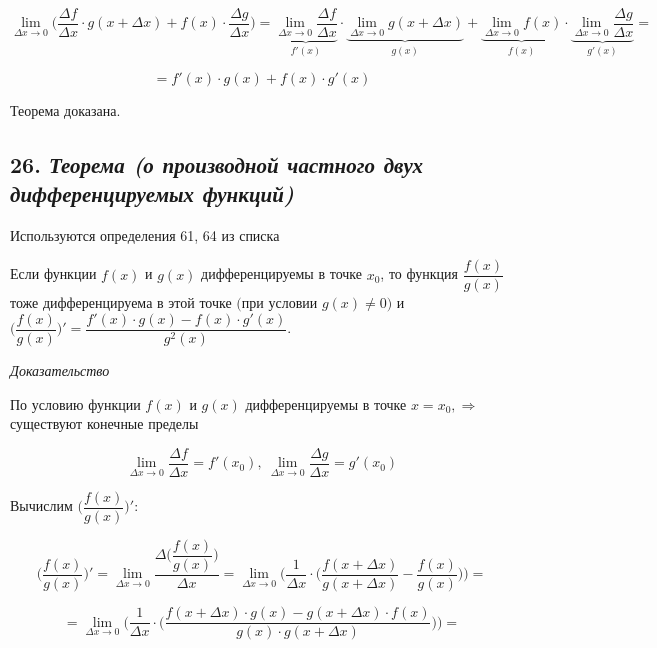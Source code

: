 $$
\lim\limits_{\Delta x \rightarrow 0}\bigg(\dfrac{\Delta f}{\Delta x}\cdot g(x + \Delta x) + f(x)\cdot \dfrac{\Delta g}{\Delta x}\bigg)
=\underbrace{\lim\limits_{\Delta x \rightarrow 0}\dfrac{\Delta f}{\Delta x}}_{f'(x)}\cdot \underbrace{\lim\limits_{\Delta x \rightarrow 0}g(x + \Delta x)}_{g(x)} + \underbrace{\lim\limits_{\Delta x \rightarrow 0}f(x)}_{f(x)}\cdot \underbrace{\lim\limits_{\Delta x \rightarrow 0}\dfrac{\Delta g}{\Delta x}}_{g'(x)}=
$$

$$ = f'(x)\cdot g(x) + f(x)\cdot g'(x) $$

Теорема доказана.
\newpage 
\subsection*{26. \textit{Теорема (о производной частного двух дифференцируемых функций)}}
\begin{Quote2} 
\small\centering 

Используются определения 61, 64 из списка \end{Quote2} 

Если функции $f(x)$ и $g(x)$ дифференцируемы в точке $x_0$, то функция ${\dfrac{f(x)}{g(x)}}$ тоже дифференцируема в этой точке $\big($при условии $g(x) \neq 0\big)$ и $\bigg({\dfrac{f(x)}{g(x)}}\bigg)' = {\dfrac{f'(x)\cdot g(x) - f(x)\cdot g'(x)}{g^2(x)}}.$
\vspace*{20pt} 

\textit{Доказательство}

По условию функции $f(x)$ и $g(x)$ дифференцируемы в точке $x = x_0, \Rightarrow$ существуют конечные пределы

$$
\lim\limits_{\Delta x \rightarrow 0}\dfrac{\Delta f}{\Delta x} = f'(x_0), \ \lim\limits_{\Delta x \rightarrow 0}\dfrac{\Delta g}{\Delta x} = g'(x_0)
$$

Вычислим $\bigg({\dfrac{f(x)}{g(x)}}\bigg)'$:

$$
\bigg({\dfrac{f(x)}{g(x)}}\bigg)' = \lim\limits_{\Delta x \rightarrow 0} {\dfrac{\Delta\bigg({\dfrac{f(x)}{g(x)}}\bigg)}{\Delta x}}
= \lim\limits_{\Delta x \rightarrow 0}\Bigg( \dfrac{1}{\Delta x}\cdot\bigg({\dfrac{f(x + \Delta x)}{g(x + \Delta x)}}-{\dfrac{f(x)}{g(x)}}\bigg)\Bigg) 
=
$$

$$
=\lim\limits_{\Delta x \rightarrow 0}\Bigg( \dfrac{1}{\Delta x}\cdot\bigg({\dfrac{f(x + \Delta x)\cdot g(x)-g(x + \Delta x)\cdot f(x)}{g(x)\cdot g(x + \Delta x)}}\bigg)\Bigg) =
$$


